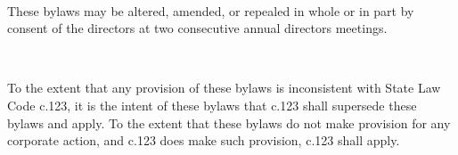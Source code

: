 \begin{art}[Amendments] ~


These bylaws may be altered, amended, or repealed in 
whole or in part by consent of the directors at two 
consecutive annual directors meetings.
\end{art}
\clearpage

\begin{art} ~


To the extent that any provision of these bylaws is inconsistent
with State Law Code c.123, it is the intent of these bylaws that
c.123 shall supersede these bylaws and apply.  To the extent that
these bylaws do not make provision for any corporate action, and
c.123 does make such provision, c.123 shall apply.

\end{art}
